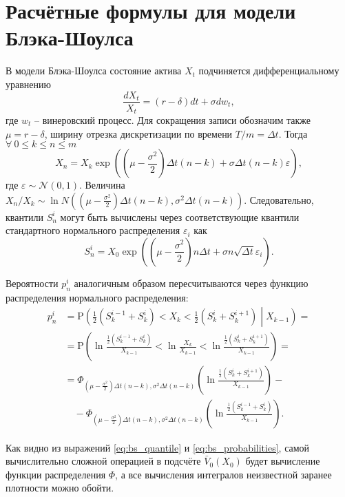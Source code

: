 \documentclass[specialist,
               substylefile = ../spbu.rtx,
               subf,href,colorlinks=true, 12pt]{disser}
\newcommand{\veps}{\varepsilon}
\newcommand{\prob}[1]{\mathrm{P}\left(#1\right)}
\newcommand{\Vbar}{\bar{V}}
\begin{document}
\chapter{Расчётные формулы для модели Блэка-Шоулса}
    В модели Блэка-Шоулса состояние актива $X_t$ подчиняется дифференциальному уравнению $$\frac{d X_t}{X_t} = \left(r - \delta\right) dt + \sigma d w_t,$$ где $w_t$ -- винеровский процесс. Для сокращения записи обозначим также $\mu = r - \delta$, ширину отрезка дискретизации по времени $T / m = \Delta t$. Тогда $\forall\: 0 \leq k \leq n \leq m$ $$X_n = X_k\exp\left(\left(\mu - \frac{\sigma^2}{2}\right)\Delta t\left(n-k\right) + \sigma\Delta t \left(n-k\right) \veps\right),$$ где $\veps\sim \mathcal N(0, 1)$. Величина $X_n / X_k \sim \ln N\left(\left(\mu - \frac{\sigma^2}{2}\right)\Delta t\left(n - k\right), \sigma^2 \Delta t\left(n - k\right)\right)$. Следовательно, квантили $S_n^i$ могут быть вычислены через соответствующие квантили стандартного нормального распределения $\veps_i$ как
    \begin{equation}\label{eq:bs_quantile}
        S_n^i = X_0\exp\left(\left(\mu - \frac{\sigma^2}{2}\right)n\Delta t + \sigma n\sqrt{\Delta t} \veps_i\right).
    \end{equation}

    Вероятности $p_n^i$ аналогичным образом пересчитываются через функцию распределения нормального распределения:
    \begin{equation}\label{eq:bs_probabilities}
    \begin{aligned}
        p_n^i &= \prob{\frac{1}{2}\left(S_k^{i-1} + S_k^i\right) < X_k < \frac{1}{2}\left(S_k^{i} + S_k^{i+1}\right)\middle\vert X_{k-1}} = \\
        &=\prob{\ln\frac{\frac{1}{2}\left(S_k^{i-1} + S_k^i\right)}{X_{k-1}} < \ln\frac{X_k}{X_{k-1}} < \ln\frac{\frac{1}{2}\left(S_k^{i} + S_k^{i+1}\right)}{X_{k-1}}} = \\
        &= \Phi_{\left(\mu - \frac{\sigma^2}{2}\right)\Delta t\left(n - k\right), \sigma^2 \Delta t\left(n - k\right)}\left(\ln\frac{\frac{1}{2}\left(S_k^{i} + S_k^{i+1}\right)}{X_{k-1}}\right) - \\ &\quad-\Phi_{\left(\mu - \frac{\sigma^2}{2}\right)\Delta t\left(n - k\right), \sigma^2 \Delta t\left(n - k\right)}\left(\ln\frac{\frac{1}{2}\left(S_k^{i-1} + S_k^{i}\right)}{X_{k-1}}\right).
    \end{aligned}
    \end{equation}

    Как видно из выражений \eqref{eq:bs_quantile} и \eqref{eq:bs_probabilities}, самой вычислительно сложной операцией в подсчёте $\Vbar_0(X_0)$ будет вычисление функции распределения $\Phi$, а все вычисления интегралов неизвестной заранее плотности можно обойти.
\end{document}
